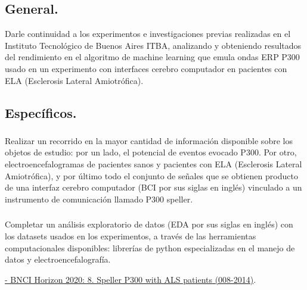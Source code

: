 \documentclass[../00_Main.tex]{subfiles}
\begin{document}
\subsection{General.}
Darle continuidad a los experimentos e investigaciones previas realizadas en el Instituto Tecnológico de Buenos Aires ITBA, analizando y obteniendo resultados del rendimiento en el algoritmo de machine learning que emula ondas ERP P300 usado en un experimento con interfaces cerebro computador en pacientes con ELA (Esclerosis Lateral Amiotrófica).

\subsection{Específicos.}

\subsubsection{} Realizar un recorrido en la mayor cantidad de información disponible sobre los objetos de estudio: por un lado, el potencial de eventos evocado P300. Por otro, electroencefalogramas de pacientes sanos y pacientes con ELA (Esclerosis Lateral Amiotrófica), y por último todo el conjunto de señales que se obtienen producto de una interfaz cerebro computador (BCI por sus siglas en inglés) vinculado a un instrumento de comunicación llamado P300 speller.

\subsubsection{} Completar un análisis exploratorio de datos (EDA por sus siglas en inglés) con los datasets usados en los experimentos, a través de las herramientas computacionales disponibles: librerías de python especializadas en el manejo de datos y electroencefalografía. 



\hspace{2cm}\href{http://bnci-horizon-2020.eu/database/data-sets}{- BNCI Horizon 2020: 8. Speller P300 with ALS patients (008-2014)}.
\end{document}
